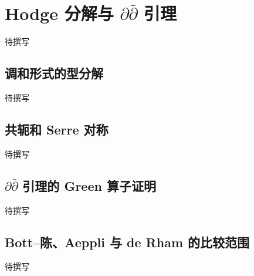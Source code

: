 
% 
% 

\section{Hodge 分解与 \texorpdfstring{\(\partial\bar{\partial}\)}{∂\={∂}} 引理}
\label{g4:sec:1704}

待撰写

\subsection{调和形式的型分解}
\label{g4:subsec:1704:01}
待撰写

\subsection{共轭和 Serre 对称}
\label{g4:subsec:1704:02}
待撰写

\subsection{\texorpdfstring{\(\partial\bar{\partial}\) 引理的 Green 算子证明}{∂\={∂} 引理的 Green 算子证明}}
\label{g4:subsec:1704:03}
待撰写

\subsection{Bott–陈、Aeppli 与 de Rham 的比较范围}
\label{g4:subsec:1704:04}
待撰写
